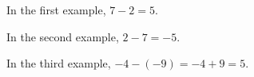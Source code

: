 In the first example, $7-2=5$.

In the second example, $2-7=-5$.

In the third example, $-4-(-9)=-4+9=5$.
